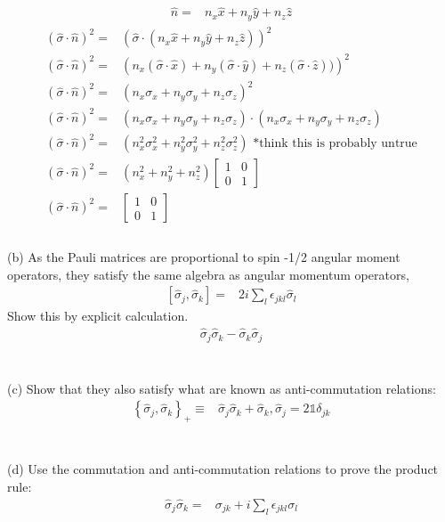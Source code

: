 \documentclass[12pt, a4paper]{article}
\begin{document}
\begin{align*}
\hat{n} =& n_x\hat{x} + n_y\hat{y} + n_z\hat{z}
\end{align*}
\begin{align*}
(\hat{\sigma}\cdot\hat{n})^2 =& 
\left(\hat{\sigma} \cdot (n_x\hat{x} + n_y\hat{y} + n_z\hat{z})\right)^2
\\
(\hat{\sigma}\cdot\hat{n})^2 =& 
\left(n_x (\hat{\sigma}\cdot\hat{x}) + n_y(\hat{\sigma}\cdot\hat{y}) + n_z(\hat{\sigma}\cdot\hat{z}))\right)^2
\\
(\hat{\sigma}\cdot\hat{n})^2 =& 
\left(n_x\sigma_x + n_y\sigma_y + n_z\sigma_z\right)^2
\\
(\hat{\sigma}\cdot\hat{n})^2 =& 
\left(n_x\sigma_x + n_y\sigma_y + n_z\sigma_z\right)
\cdot \left(n_x\sigma_x + n_y\sigma_y + n_z\sigma_z\right) 
\\
(\hat{\sigma}\cdot\hat{n})^2 =& 
\left(n_x^2\sigma_x^2 + n_y^2\sigma_y^2 + n_z^2\sigma_z^2\right)\text{ *think this is probably untrue}
\\
(\hat{\sigma}\cdot\hat{n})^2 =& 
\left(n_x^2 + n_y^2 + n_z^2\right)
\begin{bmatrix}
1&0\\0&1
\end{bmatrix}
\\
(\hat{\sigma}\cdot\hat{n})^2 =& 
\begin{bmatrix}
1&0\\0&1
\end{bmatrix}
\\
\end{align*}
\\
(b) As the Pauli matrices are proportional to spin -1/2 angular moment operators, they satisfy the same algebra as angular momentum operators,
\begin{align*}
\left[\hat{\sigma}_j,\hat{\sigma}_k\right] =& 2i\sum_l \epsilon_{jkl}\hat{\sigma}_l
\end{align*}
Show this by explicit calculation.
\begin{align*}
\hat{\sigma}_j\hat{\sigma}_k - \hat{\sigma}_k\hat{\sigma}_j
\end{align*}
\\
\\
(c) Show that they also satisfy what are known as anti-commutation relations:
\begin{align*}
\left\{\hat{\sigma}_j,\hat{\sigma}_k\right\}_+ \equiv& \hat{\sigma}_j \hat{\sigma}_k + \hat{\sigma}_k,\hat{\sigma}_j = 2\mathds{1}\delta_{jk}
\end{align*}
\\
\\
(d) Use the commutation and anti-commutation relations to prove the product rule:
\begin{align*}
\hat{\sigma}_j \hat{\sigma}_k =& \sigma_{jk} + i\sum_l \epsilon_{jkl}\sigma_l
\end{align*}
\\
\\
\end{document}
